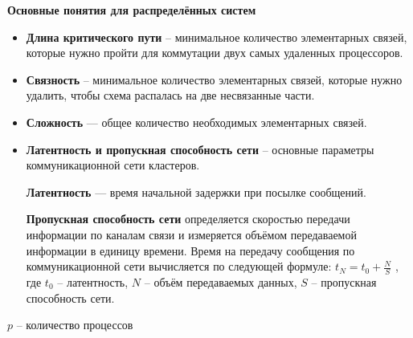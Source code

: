 \textbf{Основные понятия для распределённых систем}
\begin{itemize}
    \item \textbf{Длина критического пути} -- минимальное количество элементарных связей, которые нужно пройти для коммутации двух самых удаленных процессоров. 
    \item \textbf{Связность} -- минимальное количество элементарных связей, которые нужно удалить, чтобы схема распалась на две несвязанные части.
    \item \textbf{Сложность} --- общее количество необходимых элементарных связей. 
    \item \textbf{Латентность и пропускная способность сети} – основные параметры коммуникационной сети кластеров. 
    
    \textbf{Латентность} --- время начальной задержки при посылке сообщений. 
    
    \textbf{Пропускная способность сети} определяется скоростью передачи информации по каналам связи и измеряется объёмом передаваемой информации в единицу времени. Время на передачу сообщения по коммуникационной сети вычисляется по следующей формуле: $t_N = t_0 + \frac{N}{S}$ , где $t_0$ -- латентность, $N$ -- объём передаваемых данных, $S$ -- пропускная способность сети.
\end{itemize}

\begin{center}
    $p$ -- количество процессов
\end{center}

